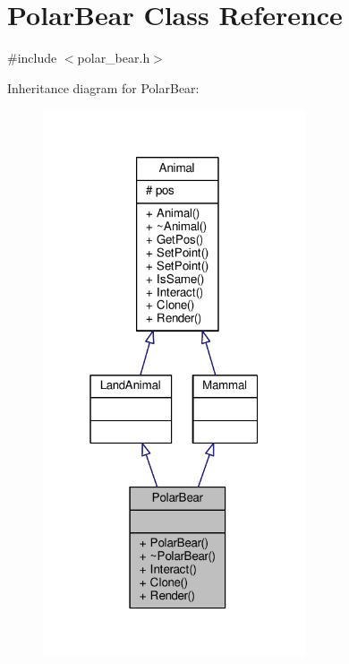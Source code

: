 \hypertarget{classPolarBear}{}\section{Polar\+Bear Class Reference}
\label{classPolarBear}


{\ttfamily \#include $<$polar\+\_\+bear.\+h$>$}



Inheritance diagram for Polar\+Bear\+:
\nopagebreak
\begin{figure}[H]
\begin{center}
\leavevmode
\includegraphics[width=220pt]{classPolarBear__inherit__graph}
\end{center}
\end{figure}



